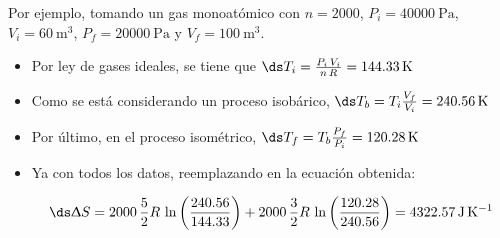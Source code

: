 Por ejemplo, tomando un gas monoatómico con $n=2000$, $P_i=\qty{40000}{\Pa}$,
$V_i = \qty{60}{\m^3}$, $P_f = \qty{20000}{\Pa}$ y $V_f = \qty{100}{\m^3}$.

\begin{itemize}
  \item Por ley de gases ideales, se tiene que $\ds T_i = \frac{P_i\,V_i}{n\,R} 
        = \qty{144.33}{\kelvin}$
  
  \item Como se está considerando un proceso isobárico, $\ds T_b = T_i\frac{V_f}{V_i} =
        \qty{240.56}{\kelvin}$
  
  \item Por último, en el proceso isométrico, $\ds T_f = T_b\frac{P_f}{P_i} =
        \qty{120.28}{\kelvin}$
  
  \item Ya con todos los datos, reemplazando en la ecuación obtenida:
  
        \[\ds\Updelta S = 2000\,\frac{5}{2}R\,\ln\left(\frac{240.56}{144.33}\right)
        + 2000\,\frac{3}{2}R\,\ln\left(\frac{120.28}{240.56}\right)
        = \qty{4322.57}{\J\per\K}\]
\end{itemize}